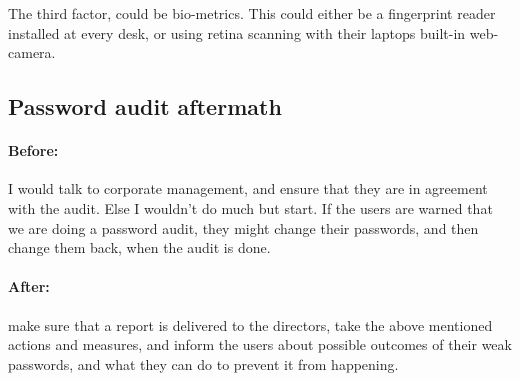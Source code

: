 The third factor, could be bio-metrics. This could either be a fingerprint
reader installed at every desk, or using retina scanning with their laptops
built-in web-camera.

\subsection{Password audit aftermath}
\paragraph{Before:} I would talk to corporate management, and ensure that they
are in agreement with the audit. Else I wouldn't do much but start. If the users
are warned that we are doing a password audit, they might change their 
passwords, and then change them back, when the audit is done.

\paragraph{After:} make sure that a report is delivered to the directors, take
the above mentioned actions and measures, and inform the users about possible
outcomes of their weak passwords, and what they can do to prevent it from
happening.
